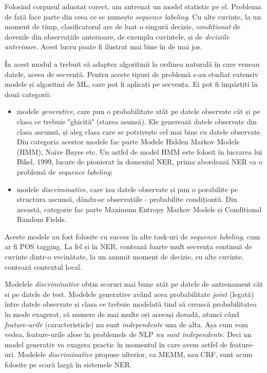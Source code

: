 Folosind corpusul adnotat corect, am antrenat un model statistic pe el. Problema de față face parte din ceea ce se numește \textit{sequence labeling}. Cu alte cuvinte, la un moment de timp, clasificatorul are de luat o singură decizie, \textit{condiționat} de dovezile din observațiile anterioare, de exemplu cuvintele, și de \textit{deciziile anterioare}. Acest lucru poate fi ilustrat mai bine în  de mai jos. 



În acest modul a trebuit să adaptez algoritmii la ordinea naturală în care veneau datele, aceea de secvență. Pentru aceste tipuri de problemă s-au studiat extensiv modele și algoritmi de ML, care pot fi aplicați pe secvența. Ei pot fi împărțiti în două categorii:

\begin{itemize}
\item modele \textit{generative}, care pun o probabilitate atât pe datele observate cât și pe clasa ce trebuie "ghicită" (starea asunsă). Ele generează datele observate din clasa ascunsă, și aleg clasa care se potrivește cel mai bine cu datele observate. Din categoria acestor modele fac parte Modele Hidden Markov Models (HMM), Naive Bayes etc. Un astfel de model HMM este folosit în lucrarea lui Bikel, 1999, lucare de pionierat în domeniul NER, prima abordează NER ca o problemă de \textit{sequence labeling}\cite{Bikel99analgorithm};
\item modele \textit{discriminative}, care iau datele observate și pun o porabilite pe structura ascunsă, dându-se observațiile - probabilite condiționtă. Din această, categorie fac parte Maximum Entropy Markov Models și Conditional Random Fields.\cite{Mccallum00maximumentropy}\cite{Lafferty01conditionalrandom}
\end{itemize}

Aceste modele au fost folosite cu succes în alte task-uri de \textit{sequence labeling}, cum ar fi POS tagging. La fel și în NER, contează foarte mult secvența continuă de cuvinte dintr-o vecinătate, la un anumit moment de decizie, cu alte cuvinte, contează contextul local.

Modelele \textit{discriminative} obțin scoruri mai bune atât pe datele de antrenament cât si pe datele de test. Modelele generative având acea probabilitate \textit{joint} (legată) între datele observate și clasa ce trebuie modelată tind să crească probabilitatea în mode exagerat, să numere de mai multe ori aceeași dovadă, atunci când \textit{feature-urile} (caracteristicle) nu sunt \textit{independente} una de alta. Așa cum vom vedea, feature-urile alese în problemele de NLP \textit{nu sunt independente}. Deci un model generativ va exagera practic în momentul în care avem astfel de feature-uri. Modelele \textit{discriminative} propuse ulterior, ca MEMM, sau CRF, sunt acum folosite pe scară largă în sistemele NER.

